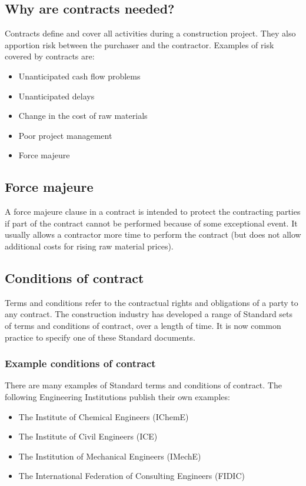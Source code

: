 \subsection{Why are contracts needed?}
Contracts define and cover all activities during a construction project. They also apportion risk between the purchaser and the contractor. Examples of risk covered by contracts are:
\begin{itemize}
    \item Unanticipated cash flow problems
    \item Unanticipated delays
    \item Change in the cost of raw materials
    \item Poor project management
    \item Force majeure
\end{itemize}
\subsection{Force majeure}
A force majeure clause in a contract is intended to protect the contracting parties if part of the contract cannot be performed because of some exceptional event. It usually allows a contractor more time to perform the contract (but does not allow additional costs for rising raw material prices).
\subsection{Conditions of contract}
Terms and conditions refer to the contractual rights and obligations of a party to any contract. The construction industry has developed a range of Standard sets of terms and conditions of contract, over a length of time. It is now common practice to specify one of these Standard documents.
\subsubsection{Example conditions of contract}
There are many examples of Standard terms and conditions of contract. The following Engineering Institutions publish their own examples:
\begin{itemize}
    \item The Institute of Chemical Engineers (IChemE)
    \item The Institute of Civil Engineers (ICE)
    \item The Institution of Mechanical Engineers (IMechE)
    \item The International Federation of Consulting Engineers (FIDIC)
\end{itemize}
